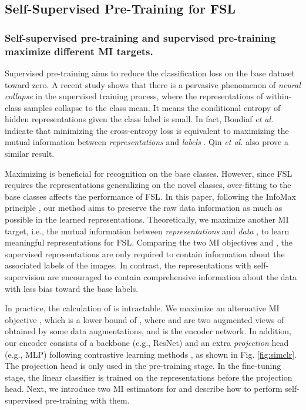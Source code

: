 \documentclass[runningheads]{llncs}
\begin{document}
\subsection{Self-Supervised Pre-Training for FSL\label{sec:method_ssl}}


\subsubsection{Self-supervised pre-training and supervised pre-training maximize different MI targets.}
Supervised pre-training aims to reduce the classification loss on the base dataset toward zero.
A recent study \cite{papyan2020prevalence} shows that there is a pervasive phenomenon of \textit{neural collapse} in the supervised training process, where the representations of within-class samples collapse to the class mean. 
It means the conditional entropy  of hidden representations  given the class label  is small.
In fact, Boudiaf \emph{et al.} \cite{boudiaf2020a} indicate that minimizing the cross-entropy loss is equivalent to maximizing the mutual information  between \emph{representations}  and \emph{labels} . Qin \emph{et al.} \cite{qin2021neural} also prove a similar result.

Maximizing  is beneficial for recognition on the base classes.
However, since FSL requires the representations generalizing on the novel classes, over-fitting to the base classes affects the performance of FSL.
In this paper, following the InfoMax principle \cite{linsker1988self}, our method aims to preserve the raw data information as much as possible in the learned representations.
Theoretically, we maximize another MI target, i.e., the mutual information  between \emph{representations}  and \emph{data} , to learn meaningful representations for FSL.
Comparing the two MI objectives  and , the supervised representations are only required to contain information about the associated labels of the images. In contrast, the representations with self-supervision are encouraged to contain comprehensive information about the data with less bias toward the base labels.

In practice, the calculation of  is intractable. 
We maximize an alternative MI objective , which is a lower bound of  \cite{tschannen2020on}, where  and  are two augmented views of  obtained by some data augmentations, and  is the encoder network. 
In addition, our encoder  consists of a backbone  (e.g., ResNet) and an extra \textit{projection} head  (e.g., MLP) following contrastive learning methods \cite{chen2020a,chen2020improved}, as shown in Fig. \ref{fig:simclr}.
The projection head is only used in the pre-training stage.
In the fine-tuning stage, the linear classifier is trained on the representations before the projection head.
Next, we introduce two MI estimators for  and describe how to perform self-supervised pre-training with them.
\end{document}
